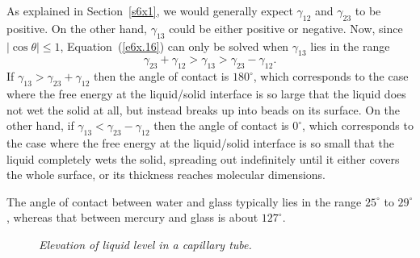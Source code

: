 As explained in Section~\ref{s6x1}, we would generally expect $\gamma_{12}$ and $\gamma_{23}$ to be positive. 
On the other hand, $\gamma_{13}$ could be either positive or negative. Now, since $|\cos\theta|\leq 1$, Equation~(\ref{e6x.16})
can only be solved when $\gamma_{13}$ lies in the range
\begin{equation}
\gamma_{23}+\gamma_{12}> \gamma_{13} > \gamma_{23}-\gamma_{12}.
\end{equation}
If $\gamma_{13}> \gamma_{23}+\gamma_{12}$ then the angle of contact is $180^\circ$, which corresponds to the case
 where the
free energy at the liquid/solid interface is so large that the liquid does not wet the solid at all, but instead breaks up into beads
 on its surface. On the other hand, if $\gamma_{13}< \gamma_{23}-\gamma_{12}$ then the
angle of contact is $0^\circ$, which corresponds to the case where the free energy at the liquid/solid
interface is so small that the liquid completely wets the solid, spreading out indefinitely until it either covers the
whole surface, or its thickness reaches molecular dimensions. 

The angle of contact between water and glass typically lies in the range $25^\circ$ to $29^\circ$, whereas
that between mercury and glass is about $127^\circ$. 

\begin{figure}
\epsfysize=3.5in
\centerline{}
\caption{\em Elevation of liquid level in a capillary tube.}\label{f6x.03}
\end{figure}

